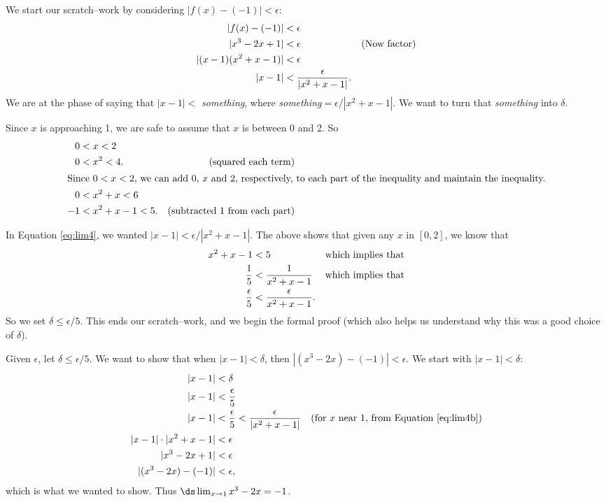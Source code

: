 {We start our scratch--work by considering $|f(x) - (-1)| < \epsilon$:
\begin{align}
|f(x)-(-1)| &< \epsilon \notag\\
|x^3-2x + 1|&< \epsilon & \text{(Now factor)}\notag\\
|(x-1)(x^2+x-1)|&< \epsilon \notag\\
|x-1| &<\frac{\epsilon}{|x^2+x-1|}.\label{eq:lim4}
\end{align}
We are at the phase of saying that $|x-1|<$ \textit{something}, where \textit{something}$=\epsilon/|x^2+x-1|$. We want to turn that \textit{something} into $\delta$.

Since $x$ is approaching 1, we are safe to assume that $x$ is between 0 and 2. So
\begin{align*}
0&< x<2  & \\
0&< x^2<4.&\text{(squared each term)}\\
\intertext{Since $0<x<2$, we can add $0$, $x$ and $2$, respectively, to each part of the inequality and maintain the inequality.}
0&< x^2+x<6 &\\
-1&< x^2+x-1<5.&\text{(subtracted 1 from each part)}
\end{align*}

In Equation \eqref{eq:lim4}, we wanted $|x-1|<\epsilon/|x^2+x-1|$. The above shows that given any $x$ in $[0,2]$, we know that 
\begin{align}
x^2+x-1 &< 5 &\text{which implies that}\notag\\
\frac15 &< \frac{1}{x^2+x-1} &\text{which implies that}\notag\\
\frac{\epsilon}5 &< \frac{\epsilon}{x^2+x-1}.\label{eq:lim4b}
\end{align}
 So we set $\delta \leq \epsilon/5$. This ends our scratch--work, and we begin the formal proof (which also helps us understand why this was a good choice of $\delta$).

Given $\epsilon$, let $\delta \leq \epsilon/5$. We want to show that when $|x-1|<\delta$, then $|(x^3-2x)-(-1)|<\epsilon$. We start with $|x-1|<\delta$:
\begin{align*}
|x-1| &< \delta \\
|x-1| &< \frac{\epsilon}5\\
|x-1| &< \frac\epsilon5 < \frac{\epsilon}{|x^2+x-1|} & \text{(for $x$ near 1, from Equation \eqref{eq:lim4b})}\\
|x-1|\cdot |x^2+x-1| &< \epsilon\\
|x^3-2x+1| &< \epsilon\\
|(x^3-2x)-(-1)| &<\epsilon,
\end{align*}
which is what we wanted to show. Thus $\ds \lim_{x\to 1}x^3-2x = -1$.
}\\

